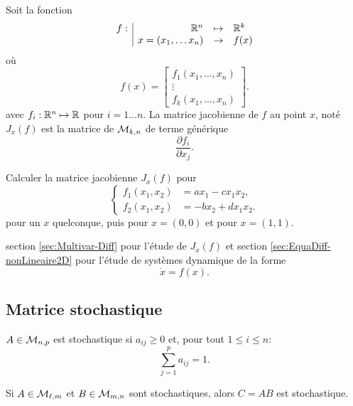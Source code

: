 \begin{definition*}
  Soit la fonction
  $$
  \begin{array}{r|rcl}
    f : & \mathbb{R}^n & \mapsto & \mathbb{R}^k \\
    & x = (x_1, \dots x_n) & \rightarrow & f(x)
  \end{array}
  $$
  où
  $$
  f(x) = \left[\begin{array}{c}
                f_1(x_1, \dots, x_n) \\
                \vdots \\
                f_k(x_1, \dots, x_n) 
               \end{array} \right].
  $$
  avec $f_i: \mathbb{R}^n \mapsto \mathbb{R}$ pour $i = 1 \dots n$.
  La matrice jacobienne de $f$ au point $x$, noté $J_x(f)$ est la matrice de $\mathcal{M}_{k, n}$ de terme générique
  $$
  \frac{\partial f_i}{\partial x_j}.
  $$
\end{definition*}

\begin{exercise*}
  Calculer la matrice jacobienne $J_x(f)$ pour
  $$
  \left\{\begin{array}{rl}
          f_1(x_1, x_2) & = a x_1 - c x_1 x_2, \\
          f_2(x_1, x_2) & = -b x_2 + d x_1 x_2.
         \end{array} \right.
  $$
pour un $x$ quelconque, puis pour $x = (0, 0)$ et pour $x=(1, 1)$.
\end{exercise*}

\remark section \ref{sec:Multivar-Diff} pour l'étude de $J_x(f)$ et section \ref{sec:EquaDiff-nonLineaire2D} pour l'étude de systèmes dynamique de la forme
$$
\dot{x} = f(x).
$$

\subsection{Matrice stochastique}  \label{sec:MatStoch}

\begin{definition*}
  $A \in \mathcal{M}_{n, p}$ est stochastique si $a_{ij} \geq 0$ et, pour tout $1 \leq i \leq n$:
  $$
  \sum_{j=1}^p a_{ij} = 1.
  $$
\end{definition*}

\begin{proposition*}
  Si $A \in \mathcal{M}_{\ell, m}$ et $B \in \mathcal{M}_{m, n}$ sont stochastiques, alors $C = A B$ est stochastique.
\end{proposition*}

